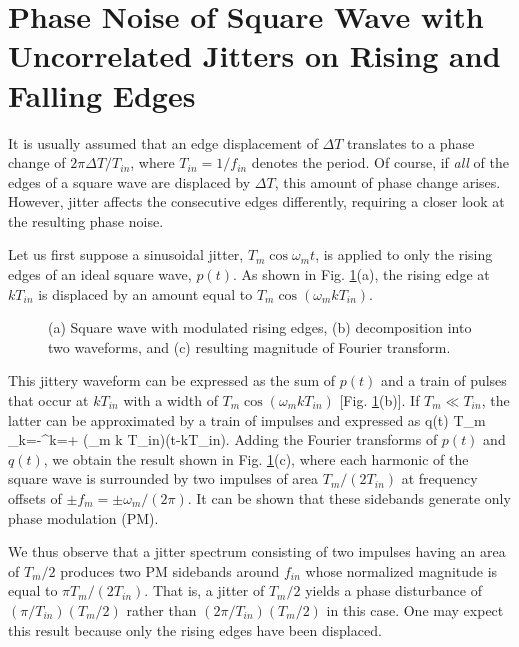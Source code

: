 \section{Phase Noise of Square Wave with Uncorrelated Jitters on Rising and Falling Edges}
It is usually assumed that an edge displacement of $\Delta T$ translates to a phase change of $2\pi \Delta T / T_{in}$, where $T_{in}=1/f_{in}$ denotes the period. Of
course, if {\em all} of the edges of a square wave are displaced by $\Delta T$, this amount of phase change arises. However, jitter affects the consecutive edges
differently, requiring a closer look at the resulting phase noise.

Let us first suppose a sinusoidal jitter, $T_m \cos \omega_m t$, is applied to only the rising edges of an ideal square wave, $p(t)$. As shown in Fig.
\ref{squaretonepn}(a), the rising edge at $k T_{in}$ is displaced by an amount equal to $T_m \cos (\omega_m k T_{in})$.
\begin{figure}[htb]
\vspace{4in}
\caption{(a) Square wave with modulated rising edges, (b) decomposition into two waveforms, and (c) resulting magnitude of Fourier transform.}
\label{squaretonepn}
\end{figure}
This jittery waveform can be expressed as the sum of $p(t)$ and a train of pulses that occur at $k T_{in}$ with a width of $T_m \cos (\omega_m k T_{in})$
[Fig. \ref{squaretonepn}(b)]. If $T_m \ll T_{in}$, the latter can be approximated by a train of impulses and expressed as
\beq
q(t) \approx T_m  \sum_{k=-\infty}^{k=+\infty} \cos (\omega_m k T_{in})\;\delta (t-k{T_{in}}).
\label{qt}
\eeq
Adding the Fourier transforms of $p(t)$ and $q(t)$, we obtain the result shown in Fig. \ref{squaretonepn}(c), where each harmonic of the square wave is
surrounded by two impulses of area $T_m / (2T_{in})$ at frequency offsets of $\pm f_m= \pm \omega _m / (2 \pi)$. It can be shown that these sidebands
generate only phase modulation (PM).

We thus observe that a jitter spectrum consisting of two impulses having an area of $T_m/2$ produces two PM sidebands around $f_{in}$ whose normalized
magnitude is equal to $\pi T_m / (2 T_{in})$. That is, a jitter of $T_m/2$ yields a phase disturbance of $(\pi /T_{in})(T_m /2)$ rather than $(2 \pi
/T_{in})(T_m /2)$ in this case. One may expect this result because only the rising edges have been displaced.

